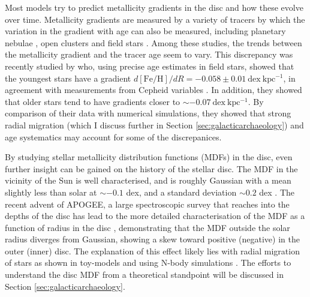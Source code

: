 Most models try to predict metallicity gradients in the disc and how these evolve over time. Metallicity gradients are measured by a variety of tracers by which the variation in the gradient with age can also be measured, including planetary nebulae \citep[e.g.][]{1994A&A...282..436M,1994Ap&SS.219..231M,2010ApJ...714.1096S,2011ApJ...738...27B}, open clusters \citep[e.g.][]{1998MNRAS.296.1045C,2002AJ....124.2693F,2004A&A...414..163S,2009A&A...494...95M,2016AN....337..922C} and field stars \citep[e.g][]{2004A&A...418..989N,2014A&A...566A..37G}. Among these studies, the trends between the metallicity gradient and the tracer age seem to vary. This discrepancy was recently studied by \citet{2016arXiv160804951A} who, using precise age estimates in field stars, showed that the youngest stars have a gradient $d\mathrm{[Fe/H]}/dR = -0.058\pm 0.01\ \mathrm{dex\ kpc^{-1}}$, in agreement with measurements from Cepheid variables \citep{2014A&A...566A..37G}. In addition, they showed that older stars tend to have gradients closer to $\sim -0.07\ \mathrm{dex\ kpc^{-1}}$. By comparison of their data with numerical simulations, they showed that strong radial migration (which I discuss further in Section \ref{sec:galacticarchaeology}) and age systematics may account for some of the discrepanices.

By studying stellar metallicity distribution functions (MDFs) in the disc, even further insight can be gained on the history of the stellar disc. The MDF in the vicinity of the Sun is well characterised, and is roughly Gaussian with a mean \feh{} slightly less than solar at $\sim -0.1$ dex, and a standard deviation $\sim 0.2$ dex  \citep{1962AJ.....67..486V,2004A&A...418..989N,2011A&A...530A.138C,2012ApJ...761..160S}. 
The recent advent of APOGEE, a large spectroscopic survey that reaches into the depths of the disc has lead to the more detailed characterisation of the MDF as a function of radius in the disc \citep[e.g.][]{2014A&A...564A.115A,2015ApJ...808..132H}, demonstrating that the MDF outside the solar radius diverges from Gaussian, showing a skew toward positive (negative) \feh{} in the outer (inner) disc. The explanation of this effect likely lies with radial migration of stars as shown in toy-models \citep{2015ApJ...808..132H} and using N-body simulations \citep{2016ApJ...818L...6L}. The efforts to understand the disc MDF from a theoretical standpoint will be discussed in Section \ref{sec:galacticarchaeology}.

